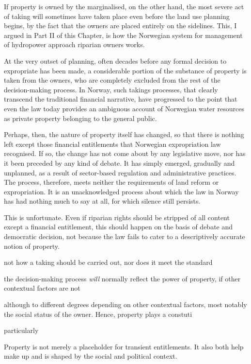 {If property is owned by the marginalised, on the other hand, the most severe act of taking will sometimes have taken place even before the land use planning begins, by the fact that the owners are placed entirely on the sidelines. This, I argued in Part II of this Chapter, is how the Norwegian system for management of hydropower approach riparian owners works. 

At the very outset of planning, often decades before any formal decision to expropriate has been made, a considerable portion of the substance of property is taken from the owners, who are completely excluded from the rest of the decision-making process. In Norway, such takings processes, that clearly transcend the traditional financial narrative, have progressed to the point that even the law today provides an ambiguous account of Norwegian water resources as private property belonging to the general public.

Perhaps, then, the nature of property itself has changed, so that there is nothing left except those financial entitlements that Norwegian expropriation law recognised. If so, the change has not come about by any legislative move, nor has it been preceded by any kind of debate. It has simply emerged, gradually and unplanned, as a result of sector-based regulation and administrative practices. The process, therefore, meets neither the requirements of land reform or expropriation. It is an unacknowledged process about which the law in Norway has had nothing much to say at all, for which silence still persists. 

This is unfortunate. Even if riparian rights should be stripped of all content except a financial entitlement, this should happen on the basis of debate and democratic decision, not because the law fails to cater to a descriptively accurate notion of property.


not how a taking should be carried out, nor does it meet the standard 




 the decision-making process {\it will} normally reflect the power of property, if other contextual factors are not 

although to different degrees depending on other contextual factors, most notably the social status of the owner. Hence, property plays a constuti


particularly 


Property is not merely a placeholder for transient entitlements. It also both help make up and is shaped by the social and political context. 


}
